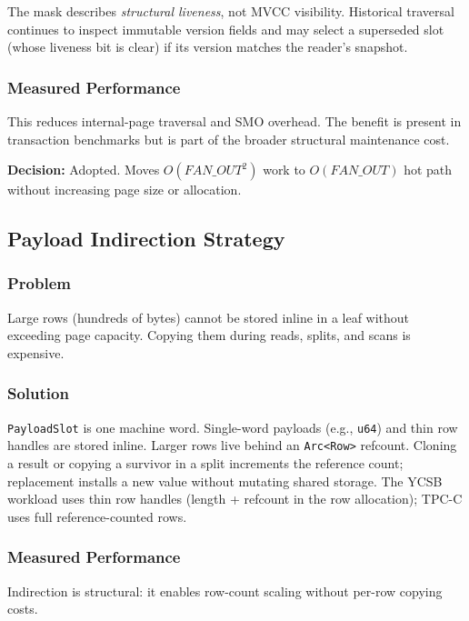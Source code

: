 \documentclass[11pt]{article}
\newcommand{\code}[1]{\texttt{#1}}
\begin{document}
The mask describes \emph{structural liveness}, not MVCC visibility. Historical traversal
continues to inspect immutable version fields and may select a superseded slot (whose
liveness bit is clear) if its version matches the reader's snapshot.

\subsubsection{Measured Performance}

This reduces internal-page traversal and SMO overhead. The benefit is present in
transaction benchmarks but is part of the broader structural maintenance cost.

\textbf{Decision:} Adopted. Moves $O(\textit{FAN\_OUT}^2)$ work to $O(\textit{FAN\_OUT})$
hot path without increasing page size or allocation.

\subsection{Payload Indirection Strategy}

\subsubsection{Problem}

Large rows (hundreds of bytes) cannot be stored inline in a leaf without exceeding page
capacity. Copying them during reads, splits, and scans is expensive.

\subsubsection{Solution}

\code{PayloadSlot} is one machine word. Single-word payloads (e.g., \code{u64}) and thin
row handles are stored inline. Larger rows live behind an \code{Arc<Row>} refcount.
Cloning a result or copying a survivor in a split increments the reference count;
replacement installs a new value without mutating shared storage. The YCSB workload
uses thin row handles (length + refcount in the row allocation); TPC-C uses full
reference-counted rows.

\subsubsection{Measured Performance}

Indirection is structural: it enables row-count scaling without per-row copying costs.
\end{document}
